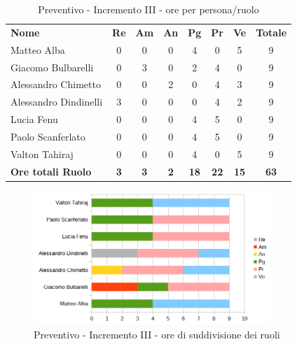 	\begin{table} [h!]
	\begin{center}
		\begin{tabular} { m{3.5cm} c c c c c c c }
			\rowcolor{lightgray}
			\textbf{Nome} & \textbf{Re} & \textbf{Am} & \textbf{An} & \textbf{Pg} & \textbf{Pr} & \textbf{Ve} & \textbf{Totale} \\
			Matteo Alba & 0& 0& 0& 4& 0& 5& 9 \\
			Giacomo Bulbarelli & 0& 3& 0& 2& 4& 0& 9 \\
			Alessandro Chimetto & 0& 0& 2& 0& 4& 3& 9 \\
			Alessandro Dindinelli & 3& 0& 0& 0& 4&2 & 9 \\
			Lucia Fenu & 0& 0& 0& 4 & 5 & 0 & 9 \\
			Paolo Scanferlato &0 & 0& 0& 4 & 5 & 0 & 9 \\
			Valton Tahiraj & 0& 0&0 &4 & 0 & 5 & 9 \\
			\textbf{Ore totali Ruolo} & \textbf{3} & \textbf{3} & \textbf{2} & \textbf{18} & \textbf{22}& \textbf{15} & \textbf{63}
		\end{tabular}
		\caption{Preventivo - Incremento III - ore per persona/ruolo}
	\end{center}
\end{table}
\begin{figure} [h!]
	\centering
	\includegraphics[width=0.8\textwidth]{res/img/preventivi/3-barre.png}
	\caption{Preventivo - Incremento III - ore di suddivisione dei ruoli} 
\end{figure}

\newpage

